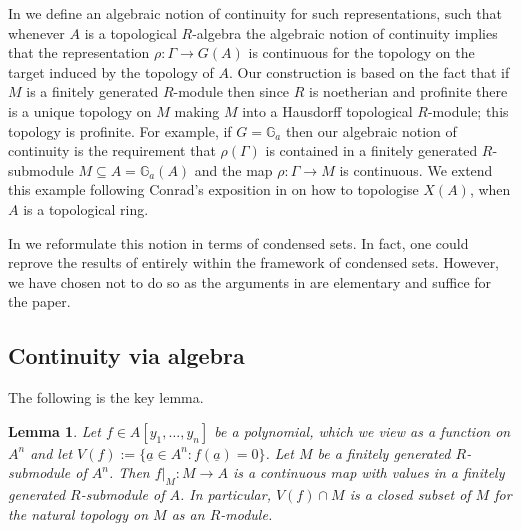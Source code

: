 \documentclass{amsart}
\newtheorem{lem}[prop]{Lemma}
\theoremstyle{definition}
\theoremstyle{remark}
\newcommand{\Ga}{\mathbb G_{a}}
\begin{document}
In  we define an algebraic  notion of continuity for such representations, 
such that whenever $A$ is a topological $R$-algebra the algebraic notion of continuity implies
that the representation $\rho:\Gamma \rightarrow G(A)$ is continuous  for  the topology on the target induced by the topology of $A$.
Our construction is based on the fact that if $M$ is a finitely generated $R$-module 
then since $R$ is noetherian and profinite there is a unique topology on $M$ making 
$M$ into a Hausdorff topological $R$-module; 
this topology is profinite. 
For example, if $G=\Ga$ then our algebraic notion of continuity 
is the requirement that $\rho(\Gamma)$ is contained in a finitely generated $R$-submodule $M \subseteq A=\Ga(A)$ and the map $\rho: \Gamma\rightarrow M$ is continuous. We extend this example 
following Conrad's exposition in \cite{ConradTopologies} on how to topologise $X(A)$, when $A$ is a topological
ring. 

In   we reformulate this notion in terms of condensed sets. In fact,
one could reprove the results of  entirely within the framework 
of condensed sets. However, we have chosen not to do so as the arguments in  
are elementary and suffice for the paper.



\subsection{Continuity via algebra}\label{sec_cont_alg}
The following is the key lemma. 
\begin{lem}\label{polyhasclosedzeroset} 
Let $f\in A[y_1,\ldots, y_n]$ be a polynomial, which 
we view as a function on $A^n$ and let $V(f):=\{\underline{a}\in A^n: f(\underline{a})=0\}$. Let $M$ be a finitely generated 
$R$-submodule of $A^n$.
Then $f|_M : M \to A$ is a continuous map with values in a finitely generated $R$-submodule of $A$.
In particular, $V(f)\cap M$ is a closed subset of $M$ 
for the natural topology on $M$ as an $R$-module.
\end{lem}
\end{document}
